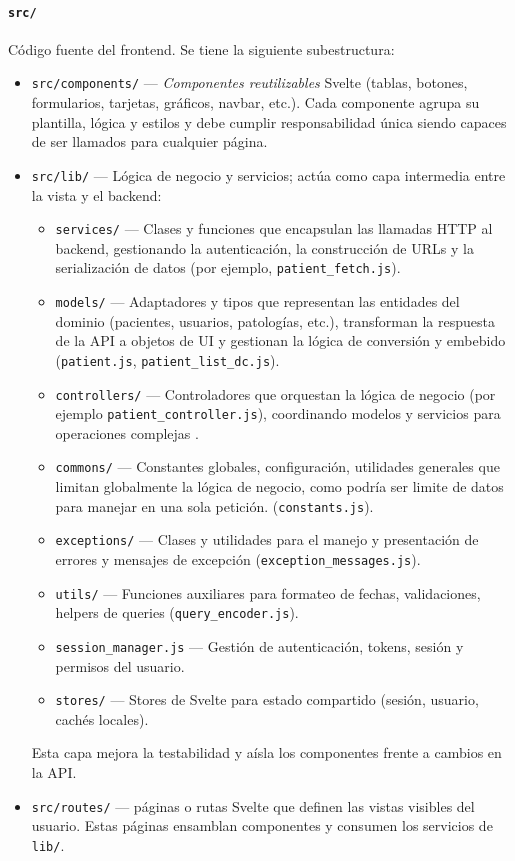 \documentclass[12pt, a4paper]{article}
\begin{document}
\paragraph{\texttt{src/}} Código fuente del frontend. Se tiene la siguiente subestructura:

\begin{itemize}
	\item \texttt{src/components/} — \emph{Componentes reutilizables} Svelte (tablas, botones, formularios, tarjetas, gráficos, navbar, etc.). Cada componente agrupa su plantilla, lógica y estilos y debe cumplir responsabilidad única siendo capaces de ser llamados para cualquier página.
	\item \texttt{src/lib/} — Lógica de negocio y servicios; actúa como capa intermedia entre la vista y el backend:
	\begin{itemize}
		\item \texttt{services/} — Clases y funciones que encapsulan las llamadas HTTP al backend, gestionando la autenticación, la construcción de URLs y la serialización de datos (por ejemplo, \texttt{patient\_fetch.js}).
		\item \texttt{models/} — Adaptadores y tipos que representan las entidades del dominio (pacientes, usuarios, patologías, etc.), transforman la respuesta de la API a objetos de UI y gestionan la lógica de conversión y embebido (\texttt{patient.js}, \texttt{patient\_list\_dc.js}).
		\item \texttt{controllers/} — Controladores que orquestan la lógica de negocio (por ejemplo \texttt{patient\_controller.js}), coordinando modelos y servicios para operaciones complejas .
		\item \texttt{commons/} — Constantes globales, configuración, utilidades generales que limitan globalmente la lógica de negocio, como podría ser limite de datos para manejar en una sola petición. (\texttt{constants.js}).
		\item \texttt{exceptions/} — Clases y utilidades para el manejo y presentación de errores y mensajes de excepción (\texttt{exception\_messages.js}).
		\item \texttt{utils/} — Funciones auxiliares para formateo de fechas, validaciones, helpers de queries (\texttt{query\_encoder.js}).
		\item \texttt{session\_manager.js} — Gestión de autenticación, tokens, sesión y permisos del usuario.
		\item \texttt{stores/} — Stores de Svelte para estado compartido (sesión, usuario, cachés locales).
	\end{itemize}
	
	Esta capa mejora la testabilidad y aísla los componentes frente a cambios en la API.
	\item \texttt{src/routes/} — páginas o rutas Svelte que definen las vistas visibles del usuario. Estas páginas ensamblan componentes y consumen los servicios de \texttt{lib/}.
\end{itemize}
\end{document}
